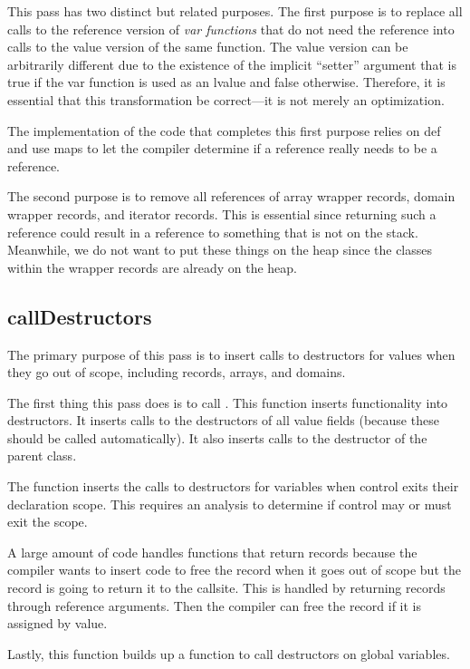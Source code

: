 \documentclass[10pt]{article}
\begin{document}
This pass has two distinct but related purposes.  The first purpose is
to replace all calls to the reference version of \emph{var functions}
that do not need the reference into calls to the value version of the
same function.  The value version can be arbitrarily different due to
the existence of the implicit ``setter'' argument that is true if the
var function is used as an lvalue and false otherwise.  Therefore, it
is essential that this transformation be correct---it is not merely an
optimization.

The implementation of the code that completes this first purpose
relies on def and use maps to let the compiler determine if a
reference really needs to be a reference.

The second purpose is to remove all references of array wrapper
records, domain wrapper records, and iterator records.  This is
essential since returning such a reference could result in a reference
to something that is not on the stack.  Meanwhile, we do not want to
put these things on the heap since the classes within the wrapper
records are already on the heap.

\subsection{callDestructors}

The primary purpose of this pass is to insert calls to destructors for
values when they go out of scope, including records, arrays, and
domains.

The first thing this pass does is to call .  This
function inserts functionality into destructors.  It inserts calls to
the destructors of all value fields (because these should be called
automatically).  It also inserts calls to the destructor of the parent
class.

The function  inserts the calls to
destructors for variables when control exits their declaration scope.
This requires an analysis to determine if control may or must exit the
scope.

A large amount of code handles functions that return records because
the compiler wants to insert code to free the record when it goes out
of scope but the record is going to return it to the callsite.  This
is handled by returning records through reference arguments.  Then the
compiler can free the record if it is assigned by value.

Lastly, this function builds up a function to call destructors on
global variables.
\end{document}
